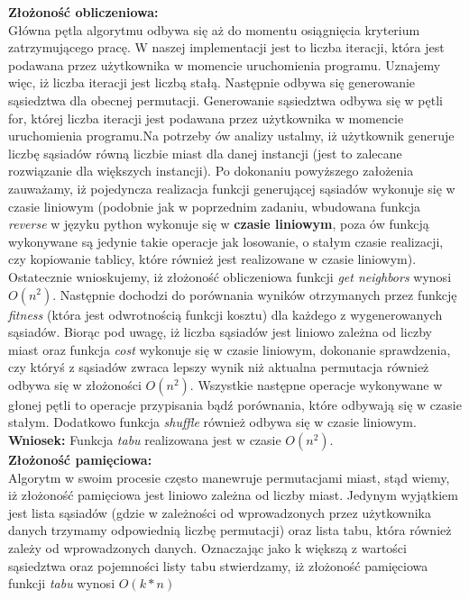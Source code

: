  \textbf{Złożoność obliczeniowa: }\\
  Główna pętla algorytmu odbywa się aż do momentu osiągnięcia kryterium zatrzymującego pracę. 
  W naszej implementacji jest to liczba iteracji, która jest podawana przez użytkownika
  w momencie uruchomienia programu. Uznajemy więc, iż liczba iteracji jest liczbą stałą.
  Następnie odbywa się generowanie sąsiedztwa dla obecnej permutacji. Generowanie sąsiedztwa odbywa się w pętli 
  for, której liczba iteracji jest podawana przez użytkownika w momencie uruchomienia programu.Na potrzeby ów analizy
  ustalmy, iż użytkownik generuje liczbę sąsiadów równą liczbie miast dla danej instancji (jest to zalecane rozwiązanie dla większych instancji). Po dokonaniu powyższego założenia 
  zauważamy, iż pojedyncza realizacja funkcji generującej sąsiadów wykonuje się w czasie liniowym (podobnie jak w poprzednim zadaniu, wbudowana funkcja \textit{reverse}
  w języku python wykonuje się w \textbf{czasie liniowym}, poza ów funkcją wykonywane są jedynie takie operacje jak losowanie, o stałym czasie realizacji, czy kopiowanie tablicy, które 
  również jest realizowane w czasie liniowym). Ostatecznie wnioskujemy, iż złożoność obliczeniowa funkcji \textit{get neighbors} wynosi $O(n^{2})$.
  Następnie dochodzi do porównania wyników otrzymanych przez funkcję \textit{fitness} (która jest odwrotnością funkcji kosztu) dla każdego z wygenerowanych sąsiadów.
  Biorąc pod uwagę, iż liczba sąsiadów jest liniowo zależna od liczby miast oraz funkcja \textit{cost} wykonuje się w czasie liniowym, dokonanie sprawdzenia, czy któryś z sąsiadów
  zwraca lepszy wynik niż aktualna permutacja również odbywa się w złożoności $O(n^{2})$. Wszystkie następne operacje wykonywane w głonej pętli to operacje 
  przypisania bądź porównania, które odbywają się w czasie stałym. Dodatkowo funkcja \textit{shuffle} również odbywa się w czasie liniowym.\\
  \textbf{Wniosek:} Funkcja \textit{tabu} realizowana jest w czasie $O(n^{2})$.\\
 \textbf{Złożoność pamięciowa: }\\
  Algorytm w swoim procesie często manewruje permutacjami miast, stąd wiemy, iż złożoność pamięciowa jest liniowo zależna od liczby miast. Jedynym wyjątkiem
  jest lista sąsiadów (gdzie w zależności od wprowadzonych przez użytkownika danych trzymamy odpowiednią liczbę permutacji) oraz lista tabu, która również zależy od wprowadzonych
  danych. Oznaczając jako k większą z wartości sąsiedztwa oraz pojemności listy tabu stwierdzamy, iż złożoność pamięciowa funkcji \textit{tabu} wynosi $O(k*n)$
